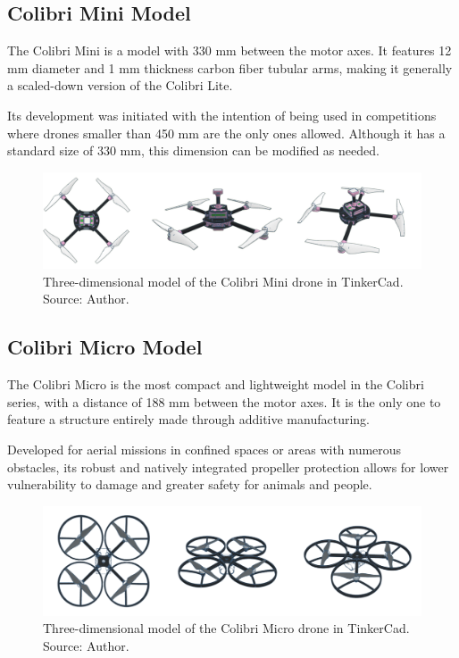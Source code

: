 \documentclass[conference]{IEEEtran}
\begin{document}
\subsection{Colibri Mini Model}
The Colibri Mini is a model with 330 mm between the motor axes. It features 12 mm diameter and 1 mm thickness carbon fiber tubular arms, making it generally a scaled-down version of the Colibri Lite.

Its development was initiated with the intention of being used in competitions where drones smaller than 450 mm are the only ones allowed. Although it has a standard size of 330 mm, this dimension can be modified as needed.

\begin{figure}[!htb]
    \centering
    \includegraphics[scale=0.14]{img/Colibri-mini.png} 
    \caption{Three-dimensional model of the Colibri Mini drone in TinkerCad. Source: Author.}
    \label{fig:ColibriMini}
\end{figure}

\subsection{Colibri Micro Model}

The Colibri Micro is the most compact and lightweight model in the Colibri series, with a distance of 188 mm between the motor axes. It is the only one to feature a structure entirely made through additive manufacturing.

Developed for aerial missions in confined spaces or areas with numerous obstacles, its robust and natively integrated propeller protection allows for lower vulnerability to damage and greater safety for animals and people.

\begin{figure}[!htb]
    \centering
    \includegraphics[scale=0.12]{img/Colibri-micro.png} 
    \caption{Three-dimensional model of the Colibri Micro drone in TinkerCad. Source: Author.}
    \label{fig:my_label}
\end{figure}
\end{document}
